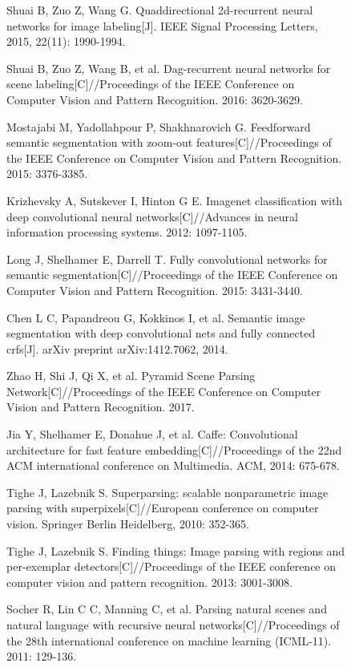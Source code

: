 \documentclass[10.5pt,compsoc]{TsT}
\theoremstyle{mystyle}
\begin{document}
{\begin{figure}[t]
\begin{thebibliography}{99}
Shuai B, Zuo Z, Wang G. Quaddirectional 2d-recurrent neural networks for image labeling[J]. IEEE Signal Processing Letters, 2015, 22(11): 1990-1994.

Shuai B, Zuo Z, Wang B, et al. Dag-recurrent neural networks for scene labeling[C]//Proceedings of the IEEE Conference on Computer Vision and Pattern Recognition. 2016: 3620-3629.

Mostajabi M, Yadollahpour P, Shakhnarovich G. Feedforward semantic segmentation with zoom-out features[C]//Proceedings of the IEEE Conference on Computer Vision and Pattern Recognition. 2015: 3376-3385.

Krizhevsky A, Sutskever I, Hinton G E. Imagenet classification with deep convolutional neural networks[C]//Advances in neural information processing systems. 2012: 1097-1105.

Long J, Shelhamer E, Darrell T. Fully convolutional networks for semantic segmentation[C]//Proceedings of the IEEE Conference on Computer Vision and Pattern Recognition. 2015: 3431-3440.

Chen L C, Papandreou G, Kokkinos I, et al. Semantic image segmentation with deep convolutional nets and fully connected crfs[J]. arXiv preprint arXiv:1412.7062, 2014.

Zhao H, Shi J, Qi X, et al. Pyramid Scene Parsing Network[C]//Proceedings of the IEEE Conference on Computer Vision and Pattern Recognition. 2017.

Jia Y, Shelhamer E, Donahue J, et al. Caffe: Convolutional architecture for fast feature embedding[C]//Proceedings of the 22nd ACM international conference on Multimedia. ACM, 2014: 675-678.

Tighe J, Lazebnik S. Superparsing: scalable nonparametric image parsing with superpixels[C]//European conference on computer vision. Springer Berlin Heidelberg, 2010: 352-365.

Tighe J, Lazebnik S. Finding things: Image parsing with regions and per-exemplar detectors[C]//Proceedings of the IEEE conference on computer vision and pattern recognition. 2013: 3001-3008.

Socher R, Lin C C, Manning C, et al. Parsing natural scenes and natural language with recursive neural networks[C]//Proceedings of the 28th international conference on machine learning (ICML-11). 2011: 129-136.


\end{thebibliography}
\end{figure}}
\end{document}
